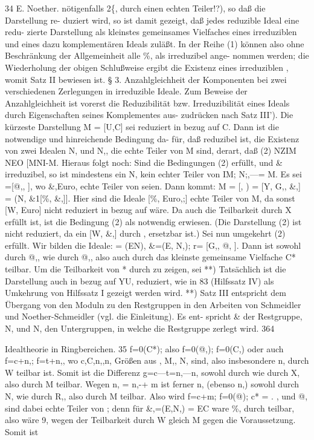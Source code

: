 \documentclass[11pt,a4paper]{article}
\theoremstyle{plain}
\theoremstyle{definition}
\begin{document}
34 
E. Noether. 
nötigenfalls 2\{, durch einen echten Teiler!?), 
so daß die Darstellung re- 
duziert wird, 
so ist damit gezeigt, daß jedes reduzible Ideal eine redu- 
zierte Darstellung als kleinstes gemeinsames Vielfaches eines irreduziblen 
und eines dazu komplementären Ideals zuläßt. 
In der Reihe (1) können 
also ohne Beschränkung 
der Allgemeinheit 
alle \%, als irreduzibel ange- 
nommen 
werden; die Wiederholung der obigen Schlußweise 
ergibt die 
Existenz eines irreduziblen , womit Satz II bewiesen ist. 
\S{} 3. 
Anzahlgleichheit der Komponenten bei zwei verschiedenen Zerlegungen 
in irreduzible Ideale. 
Zum Beweise der Anzahlgleichheit ist vorerst die Reduzibilität bzw. 
Irreduzibilität eines Ideals durch Eigenschaften seines Komplementes aus- 
zudrücken nach 
Satz III'). 
Die kürzeste Darstellung M = [U,C] sei reduziert in 
bezug auf C. 
Dann ist die notwendige und hinreichende Bedingung da- 
für, daß  reduzibel ist, die Existenz von zwei Idealen N, und N,, die 
echte Teiler von M sind, derart, daß 
(2) 
NZIM NEO [MNI-M. 
Hieraus folgt noch: Sind die Bedingungen (2) erfüllt, und \& irreduzibel, 
so ist mindestens ein N, kein echter Teiler von IM; N;,---= M. 
Es sei 
 =[@,, ], wo \&,Euro, echte Teiler von  seien. 
Dann 
kommt: 
M = [, ) = [Y, G,, \&,] = (N, \&1[\%, \&,]]. 
Hier sind die Ideale [\%, Euro,;] echte Teiler von M, da sonst [W, Euro] nicht 
reduziert in bezug auf  wäre. 
Da auch die Teilbarkeit durch X erfüllt 
ist, ist die Bedingung (2) als notwendig erwiesen. 
(Die Darstellung (2) 
ist nicht reduziert, da ein [W, \&,] durch , ersetzbar ist.) 
Sei nun umgekehrt (2) erfüllt. 
Wir bilden die Ideale: 
= (EN), 
\&=(E, N,); r= [G,, @, ]. 
Dann ist  sowohl durch @,, wie durch @,, also auch durch das kleinste 
gemeinsame Vielfache C* teilbar. 
Um die Teilbarkeit von * durch  
zu zeigen, sei 
**) Tatsächlich ist die Darstellung auch in bezug auf YU, reduziert, 
wie in 83 
(Hilfssatz IV) als Umkehrung von Hilfssatz I gezeigt werden wird. 
**) Satz III entspricht dem Übergang von den Moduln zu den Restgruppen in 
den Arbeiten von Schmeidler und Noether-Schmeidler (vgl. die Einleitung). 
Es ent- 
spricht \& der Restgruppe, N, und N, den Untergruppen, 
in welche die Restgruppe 
zerlegt wird. 
364

Idealtheorie in Ringbereichen. 
35 
f=0(C*); 
also f=0(@,); f=0(C,) 
oder auch f=c+n,; f=t+n,, 
wo c,C,n,,n, Größen aus , M,, N, sind, also insbesondere n, durch W 
teilbar ist. 
Somit ist die Differenz 
g=c---t=n,---n, 
sowohl durch  wie durch X, also durch M teilbar. 
Wegen n, = n,-+ m 
ist ferner n, (ebenso n,) sowohl durch N, wie durch R,, also durch M 
teilbar. 
Also wird 
f=c+m; 
f=0(@); c* 
= . 
, und @, sind dabei echte Teiler 
von 
; denn für \&,=(E,N,) = EC 
ware \%, durch  teilbar, 
also wäre 9, wegen der Teilbarkeit 
durch W 
gleich M gegen die Voraussetzung. 
Somit ist 
 
\end{document}
